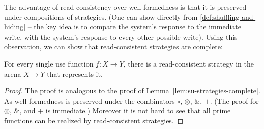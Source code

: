 The advantage of read-consistency over well-formedness is that it is preserved under compositions of strategies. 
(One can show directly from \ref{def:shuffling-and-hiding} -- the key idea is to compare the system's response to the immediate write,
with the system's response to every other possible write). Using this observation, we can show that read-consistent strategies are complete:
\begin{lemma}\label{lem:all-read-consistent}
    For every single use function $f : X \to Y$, there is a read-consistent strategy in the arena $X \to Y$ that represents it. 
\end{lemma}
\begin{proof}
    The proof is analogous to the proof of Lemma~\ref{lem:su-strategies-complete}. As well-formedness is preserved
    under the combinators $\circ$, $\otimes$, $\&$, $+$. (The proof for $\otimes$, $\&$, and $+$ is immediate.)
    Moreover it is not hard to see that all prime functions can be realized by read-consistent strategies. 
\end{proof}


